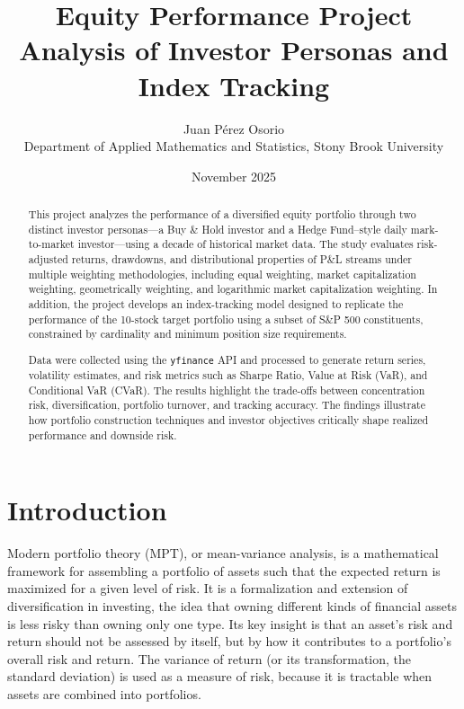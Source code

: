 \documentclass[12pt, a4paper]{article}
\title{
	\vspace{-2cm}
	\textbf{Equity Performance Project}\\[0.5em]
	\large \textbf{ Analysis of Investor Personas and Index Tracking} 
}
\author{
	Juan Pérez Osorio \\[0.3em]
	Department of Applied Mathematics and Statistics, Stony Brook University
}
\date{November 2025}
\begin{document}
	
	\maketitle %
	
	\thispagestyle{empty} %
	
	\newpage
	
	\tableofcontents %
	
	\newpage
	
	\begin{abstract}
		This project analyzes the performance of a diversified equity portfolio through two distinct investor personas—a Buy \& Hold investor and a Hedge Fund–style daily mark-to-market investor—using a decade of historical market data. The study evaluates risk-adjusted returns, drawdowns, and distributional properties of P\&L streams under multiple weighting methodologies, including equal weighting, market capitalization weighting, geometrically weighting, and logarithmic market capitalization weighting. In addition, the project develops an index-tracking model designed to replicate the performance of the 10-stock target portfolio using a subset of S\&P 500 constituents, constrained by cardinality and minimum position size requirements.
		
		Data were collected using the \texttt{yfinance} API and processed to generate return series, volatility estimates, and risk metrics such as Sharpe Ratio, Value at Risk (VaR), and Conditional VaR (CVaR). The results highlight the trade-offs between concentration risk, diversification, portfolio turnover, and tracking accuracy. The findings illustrate how portfolio construction techniques and investor objectives critically shape realized performance and downside risk.
	\end{abstract}
	
	
	\section{Introduction}
	
	
	Modern portfolio theory (MPT), or mean-variance analysis, is a mathematical framework for assembling a portfolio of assets such that the expected return is maximized for a given level of risk. It is a formalization and extension of diversification in investing, the idea that owning different kinds of financial assets is less risky than owning only one type. Its key insight is that an asset's risk and return should not be assessed by itself, but by how it contributes to a portfolio's overall risk and return. The variance of return (or its transformation, the standard deviation) is used as a measure of risk, because it is tractable when assets are combined into portfolios.
	
\end{document}
